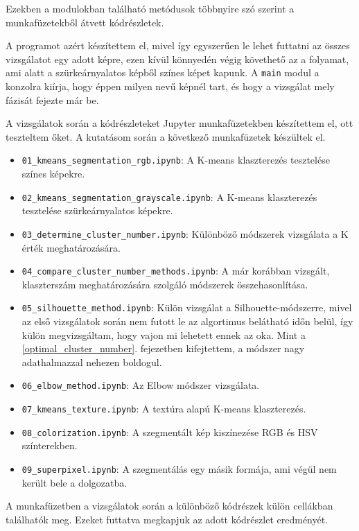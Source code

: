 Ezekben a modulokban található metódusok többnyire szó szerint a munkafüzetekből átvett kódrészletek.

A programot azért készítettem el, mivel így egyszerűen le lehet futtatni az összes vizsgálatot egy adott képre, ezen kívül könnyedén végig követhető az a folyamat, ami alatt a szürkeárnyalatos képből színes képet kapunk. A \texttt{main} modul a konzolra kiírja, hogy éppen milyen nevű képnél tart, és hogy a vizsgálat mely fázisát fejezte már be.


A vizsgálatok során a kódrészleteket Jupyter munkafüzetekben készítettem el, ott teszteltem őket. A kutatásom során a következő munkafüzetek készültek el.
\begin{itemize}
\item \texttt{01\_kmeans\_segmentation\_rgb.ipynb}: A K-means klaszterezés tesztelése színes képekre. 
\item \texttt{02\_kmeans\_segmentation\_grayscale.ipynb}: A K-means klaszterezés tesztelése szürkeárnyalatos képekre.
\item \texttt{03\_determine\_cluster\_number.ipynb}: Különböző módszerek vizsgálata a K érték meghatározására. 
\item \texttt{04\_compare\_cluster\_number\_methods.ipynb}: A már korábban vizsgált, klaszterszám meghatározására szolgáló módszerek összehasonlítása.
\item \texttt{05\_silhouette\_method.ipynb}: Külön vizsgálat a Silhouette-módszerre, mivel az első vizsgálatok során nem futott le az algortimus belátható időn belül, így külön megvizsgáltam, hogy vajon mi lehetett ennek az oka. Mint a \ref{optimal_cluster_number}. fejezetben kifejtettem, a módszer nagy adathalmazzal nehezen boldogul.
\item \texttt{06\_elbow\_method.ipynb}: Az Elbow módszer vizsgálata.
\item \texttt{07\_kmeans\_texture.ipynb}: A textúra alapú K-means klaszterezés.
\item \texttt{08\_colorization.ipynb}: A szegmentált kép kiszínezése RGB és HSV színterekben. 
\item \texttt{09\_superpixel.ipynb}: A szegmentálás egy másik formája, ami végül nem került bele a dolgozatba. 
\end{itemize}

A munkafüzetben a vizsgálatok során a különböző kódrészek külön cellákban találhatók meg. Ezeket futtatva megkapjuk az adott kódrészlet eredményét. 